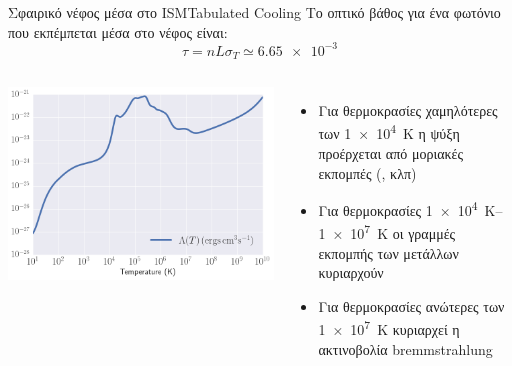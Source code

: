 \documentclass{beamer}
\begin{document}
\begin{frame}{Σφαιρικό νέφος μέσα στο ISM}{Tabulated Cooling}
		Το οπτικό βάθος για ένα φωτόνιο που εκπέμπεται μέσα στο νέφος είναι:
	\begin{equation}
	\tau = nL\sigma _T\simeq \num{6.65e-3}
	\end{equation}
	
\begin{columns}
	\begin{center}
		\includegraphics[width=1\linewidth]{../Document/Images/LambdaT}
	\end{center}
	\begin{itemize}
		\item{Για θερμοκρασίες χαμηλότερες των \SI{1e4}{K} η ψύξη προέρχεται από μοριακές εκπομπές (, κλπ)}
		\item{Για θερμοκρασίες \SIrange{1e4}{1e7}{K} οι γραμμές εκπομπής των μετάλλων κυριαρχούν}
		\item{Για θερμοκρασίες ανώτερες των \SI{1e7}{K} κυριαρχεί η ακτινοβολία bremmstrahlung}
	\end{itemize}
\end{columns}
\end{frame}
\end{document}
